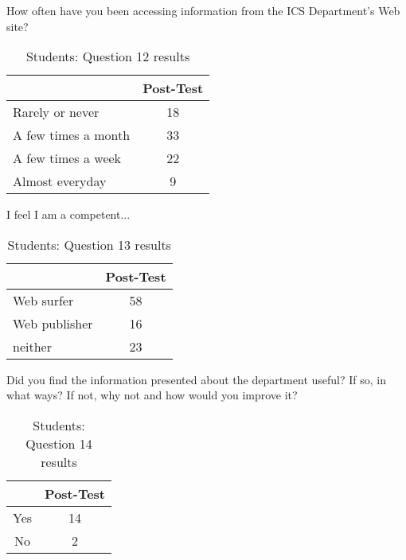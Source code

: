\begin{table}[htbp]
\caption{Students: Question 12 results}
{How often have you been accessing information from the ICS
  Department's Web site?}
\begin{center}
\begin{tabular}{|l|c|} \hline
  & {\bf Post-Test} \\ \hline 
 {Rarely or never} & 18 \\ \hline 
 {A few times a month} & 33 \\ \hline 
 {A few times a week} & 22 \\ \hline 
 {Almost everyday} & 9 \\ \hline 
\end{tabular}
\end{center}
\label{tab:question12s}
\end{table}

\begin{table}[htbp]
\caption{Students: Question 13 results}
{I feel I am a competent...}
\begin{center}
\begin{tabular}{|l|c|} \hline
  & {\bf Post-Test} \\ \hline 
 {Web surfer} & 58 \\ \hline 
 {Web publisher} & 16 \\ \hline 
 {neither} & 23 \\ \hline 
\end{tabular}
\end{center}
\label{tab:question13s}
\end{table}

\begin{table}[htbp]
\caption{Students: Question 14 results}
{Did you find the information presented about the department useful?
  If so, in what ways?  If not, why not and how would you improve it?}
\begin{center}
\begin{tabular}{|c|c|} \hline
  & {\bf Post-Test} \\ \hline 
 Yes & 14 \\ \hline 
 No  & 2 \\ \hline 
\end{tabular}
\end{center}
\label{tab:question14s}
\end{table}

